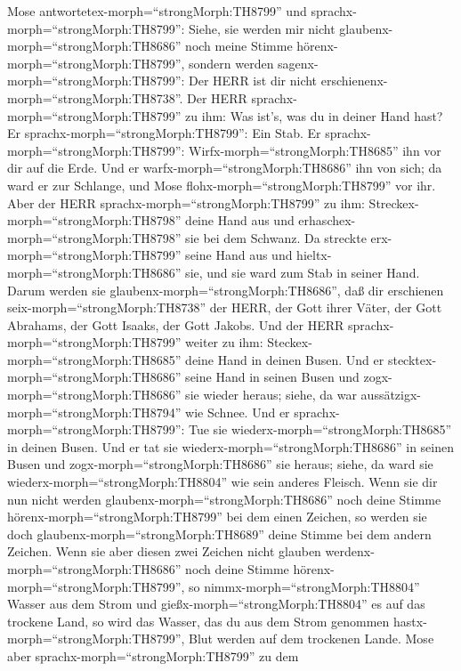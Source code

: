  Mose antwortetex-morph=``strongMorph:TH8799'' und
sprachx-morph=``strongMorph:TH8799'': Siehe, sie werden mir nicht
glaubenx-morph=``strongMorph:TH8686'' noch meine Stimme
hörenx-morph=``strongMorph:TH8799'', sondern werden
sagenx-morph=``strongMorph:TH8799'': Der HERR ist dir nicht
erschienenx-morph=``strongMorph:TH8738''.  Der HERR
sprachx-morph=``strongMorph:TH8799'' zu ihm: Was ist's, was du in deiner
Hand hast? Er sprachx-morph=``strongMorph:TH8799'': Ein Stab.
 Er sprachx-morph=``strongMorph:TH8799'':
Wirfx-morph=``strongMorph:TH8685'' ihn vor dir auf die Erde. Und er
warfx-morph=``strongMorph:TH8686'' ihn von sich; da ward er zur
Schlange, und Mose flohx-morph=``strongMorph:TH8799'' vor ihr.
 Aber der HERR sprachx-morph=``strongMorph:TH8799'' zu ihm:
Streckex-morph=``strongMorph:TH8798'' deine Hand aus und
erhaschex-morph=``strongMorph:TH8798'' sie bei dem Schwanz. Da streckte
erx-morph=``strongMorph:TH8799'' seine Hand aus und
hieltx-morph=``strongMorph:TH8686'' sie, und sie ward zum Stab in seiner
Hand.  Darum werden sie
glaubenx-morph=``strongMorph:TH8686'', daß dir erschienen
seix-morph=``strongMorph:TH8738'' der HERR, der Gott ihrer Väter, der
Gott Abrahams, der Gott Isaaks, der Gott Jakobs.  Und der
HERR sprachx-morph=``strongMorph:TH8799'' weiter zu ihm:
Steckex-morph=``strongMorph:TH8685'' deine Hand in deinen Busen. Und er
stecktex-morph=``strongMorph:TH8686'' seine Hand in seinen Busen und
zogx-morph=``strongMorph:TH8686'' sie wieder heraus; siehe, da war
aussätzigx-morph=``strongMorph:TH8794'' wie Schnee.  Und er
sprachx-morph=``strongMorph:TH8799'': Tue sie
wiederx-morph=``strongMorph:TH8685'' in deinen Busen. Und er tat sie
wiederx-morph=``strongMorph:TH8686'' in seinen Busen und
zogx-morph=``strongMorph:TH8686'' sie heraus; siehe, da ward sie
wiederx-morph=``strongMorph:TH8804'' wie sein anderes Fleisch.
 Wenn sie dir nun nicht werden
glaubenx-morph=``strongMorph:TH8686'' noch deine Stimme
hörenx-morph=``strongMorph:TH8799'' bei dem einen Zeichen, so werden sie
doch glaubenx-morph=``strongMorph:TH8689'' deine Stimme bei dem andern
Zeichen.  Wenn sie aber diesen zwei Zeichen nicht glauben
werdenx-morph=``strongMorph:TH8686'' noch deine Stimme
hörenx-morph=``strongMorph:TH8799'', so
nimmx-morph=``strongMorph:TH8804'' Wasser aus dem Strom und
gießx-morph=``strongMorph:TH8804'' es auf das trockene Land, so wird das
Wasser, das du aus dem Strom genommen
hastx-morph=``strongMorph:TH8799'', Blut werden auf dem trockenen Lande.
 Mose aber sprachx-morph=``strongMorph:TH8799'' zu dem
